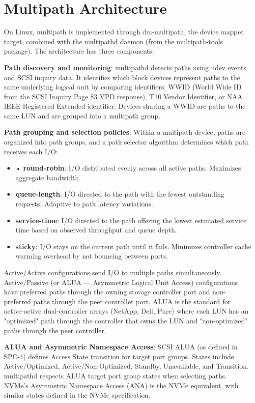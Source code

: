 \section{Multipath Architecture}
On Linux, multipath is implemented through dm-multipath, the device mapper target, combined with the multipathd daemon (from the multipath-tools package). The architecture has three components:

\textbf{Path discovery and monitoring}: multipathd detects paths using udev events and SCSI inquiry data. It identifies which block devices represent paths to the same underlying logical unit by comparing identifiers: WWID (World Wide ID from the SCSI Inquiry Page 83 VPD response), T10 Vendor Identifier, or NAA IEEE Registered Extended identifier. Devices sharing a WWID are paths to the same LUN and are grouped into a multipath group.

\textbf{Path grouping and selection policies}: Within a multipath device, paths are organized into path groups, and a path selector algorithm determines which path receives each I/O:

\begin{itemize}
  \item • \textbf{round-robin}: I/O distributed evenly across all active paths. Maximizes aggregate bandwidth.
  \item \textbf{queue-length}: I/O directed to the path with the fewest outstanding requests. Adaptive to path latency variations.
  \item \textbf{service-time}: I/O directed to the path offering the lowest estimated service time based on observed throughput and queue depth.
  \item \textbf{sticky}: I/O stays on the current path until it fails. Minimizes controller cache warming overhead by not bouncing between ports.
\end{itemize}

Active/Active configurations send I/O to multiple paths simultaneously. Active/Passive (or ALUA --- Asymmetric Logical Unit Access) configurations have preferred paths through the owning storage controller port and non-preferred paths through the peer controller port. ALUA is the standard for active-active dual-controller arrays (NetApp, Dell, Pure) where each LUN has an "optimized" path through the controller that owns the LUN and "non-optimized" paths through the peer controller.

\textbf{ALUA and Asymmetric Namespace Access}: SCSI ALUA (as defined in SPC-4) defines Access State transition for target port groups. States include Active/Optimized, Active/Non-Optimized, Standby, Unavailable, and Transition. multipathd respects ALUA target port group states when selecting paths. NVMe's Asymmetric Namespace Access (ANA) is the NVMe equivalent, with similar states defined in the NVMe specification.

